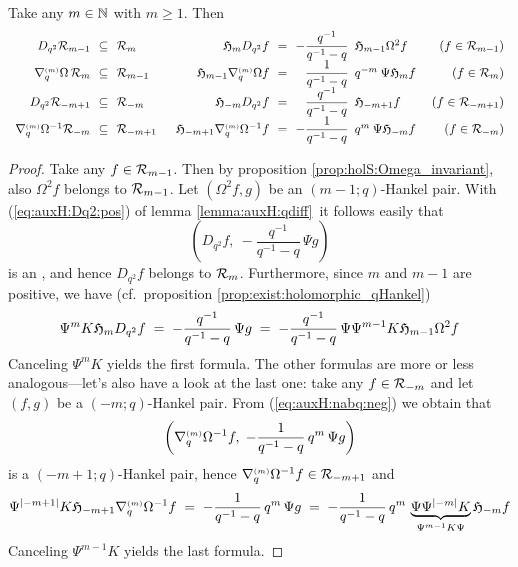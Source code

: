 \begin{prop} \label{prop:holqHankel:qdiff}
Take any $m\in \mathbb{N}$ with $m\geq 1$. Then
$$\begin{array}{rclrcrlr}
D_{q^2} \holS{m-1} & \!\! \subseteq&  \!\! \holS{m} &
   \holH{m} D_{q^2} f &\!\! =&  \!\! \displaystyle -\frac{q^{-1}}{q^{-1}-q}&
              \!\!\! \holH{m-1} \Omega^2 f & \;(f\in \holS{m-1}) \\
\nabq{m} \Omega \, \holS{m}& \!\! \subseteq&  \!\! \holS{m-1} &
   \holH{m-1} \nabq{m} \Omega f & \!\! =&  \!\!  \displaystyle
          \frac{1}{q^{-1}-q} &  \!\!\! q^{-m}\: \Psi \holH{m}f & \;(f\in \holS{m}) \\
D_{q^2} \holS{-m+1} & \!\! \subseteq& \!\! \holS{-m} &
   \holH{-m} D_{q^2}f & \!\! =& \!\! \displaystyle  \frac{q^{-1}}{q^{-1}-q} &
    \!\!\! \holH{-m+1}f & \;(f\in \holS{-m+1})  \\
\nabq{m} \Omega^{-1}  \holS{-m} & \!\! \subseteq& \!\! \holS{-m+1} \;\; &
   \holH{-m+1} \nabq{m} \Omega^{-1}f & \!\!=&  \!\!\displaystyle -\frac{1}{q^{-1}-q} &
      \!\!\!   q^m\: \Psi \holH{-m} f & (f\in \holS{-m})
\end{array}$$
\end{prop}
\begin{proof}
Take any $f\in {\mathcal R}_{m-1}$. Then by proposition
\ref{prop:holS:Omega_invariant}, also $\Omega^2 f$ belongs to ${\mathcal R}_{m-1}$.
Let $(\Omega^2 f,g)$ be an \mbox{$(m-1;q)$-Hankel} pair.
With (\ref{eq:auxH:Dq2:pos}) of lemma \ref{lemma:auxH:qdiff}\ it
follows easily that
$$ \left(D_{q^2}f,\:-\frac{q^{-1}}{q^{-1}-q} \,\Psi g \right) $$
is an \Hmpair, and hence $D_{q^2}f$ belongs to ${\mathcal R}_{m}$.
Furthermore, since $m$ and $m-1$ are positive, we have
(cf.\ proposition \ref{prop:exist:holomorphic_qHankel})
$$ \Psi^m K \mathfrak{H}_{m} D_{q^2}f \;=\; -\frac{q^{-1}}{q^{-1}-q}\, \Psi g
    \;=\; -\frac{q^{-1}}{q^{-1}-q}\, \Psi \Psi^{m-1} K \mathfrak{H}_{m-1} \Omega^2 f $$
Canceling $\Psi^m K$ yields the first formula. The other formulas
are more or less analogous---let's also have a look at the last one:
take any $f\in {\mathcal R}_{-m}$ and let $(f,g)$ be a \mbox{$(-m;q)$-Hankel} pair.
From (\ref{eq:auxH:nabq:neg}) we obtain that
$$ \left(\nabla_q^{\scriptscriptstyle (m)} \Omega^{-1}f, \; -\frac{1}{q^{-1}-q} \, q^m\, \Psi g \right)$$
is a \mbox{$(-m+1;q)$-Hankel} pair, hence $\nabla_q^{\scriptscriptstyle (m)} \Omega^{-1}f \in {\mathcal R}_{-m+1}$ and
$$ \Psi^{|-m+1|} K \mathfrak{H}_{-m+1} \nabla_q^{\scriptscriptstyle (m)} \Omega^{-1} f
  \;=\;  -\frac{1}{q^{-1}-q} \, q^m\, \Psi g
  \;=\;  -\frac{1}{q^{-1}-q} \, q^m\,
  \underbrace{\Psi \Psi^{|-m|} K}_{\Psi^{m-1} K \Psi} \mathfrak{H}_{-m} f $$
Canceling $\Psi^{m-1} K$ yields the last formula.
\end{proof}

